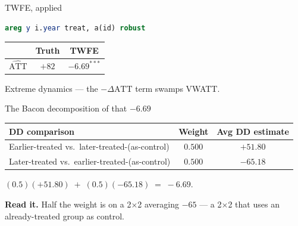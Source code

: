 \documentclass[aspectratio=169,11pt]{beamer}
\begin{document}
\begin{frame}[fragile]{TWFE, applied}
\begin{lstlisting}[language=Stata,basicstyle=\ttfamily\scriptsize]
areg y i.year treat, a(id) robust
\end{lstlisting}

\vspace{0.8em}
\begin{center}\large
\begin{tabular}{lcc}
\toprule
& \textbf{Truth} & \textbf{TWFE} \\
\midrule
$\widehat{\text{ATT}}$ & $+82$ & $-6.69^{\ast\ast\ast}$ \\
\bottomrule
\end{tabular}
\end{center}

\vspace{1em}
 \;Extreme dynamics --- the $-\Delta\text{ATT}$ term swamps VWATT.
\end{frame}

\begin{frame}{The Bacon decomposition of that $-6.69$}
\vspace{0.6em}
\begin{center}
\begin{tabular}{lcc}
\toprule
\textbf{DD comparison} & \textbf{Weight} & \textbf{Avg DD estimate} \\
\midrule
Earlier-treated vs.\ later-treated-(as-control) & $0.500$ & $+51.80$ \\
Later-treated vs.\ earlier-treated-(as-control) & $0.500$ & $-65.18$ \\
\bottomrule
\end{tabular}
\end{center}

\vspace{0.7em}
\begin{center}\large
$(0.5)(+51.80) \;+\; (0.5)(-65.18) \;=\; -6.69.$
\end{center}

\vspace{0.7em}
\textbf{Read it.} \;Half the weight is on a 2$\times$2 averaging $-65$ --- a 2$\times$2 that uses an already-treated group as control. \;
\end{frame}

\end{document}
